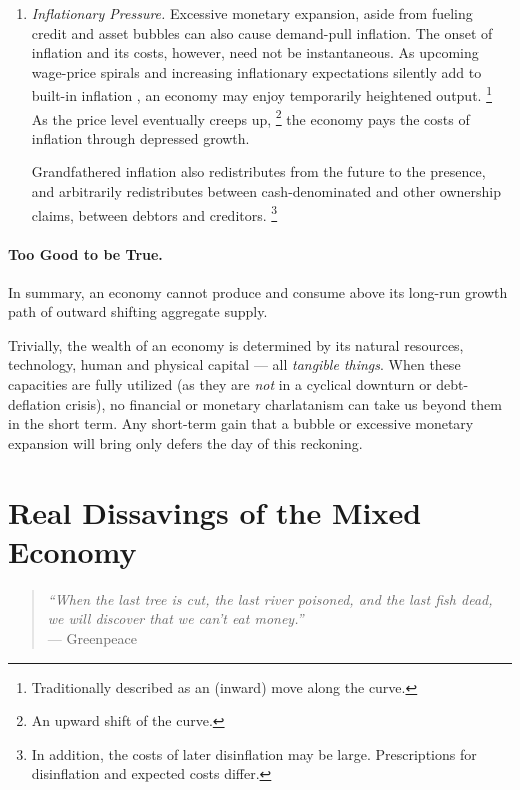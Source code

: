 \begin{enumerate}
	\item {} \label{itm:inflationary-pressure} \emph{Inflationary Pressure.} Excessive monetary expansion, aside from fueling credit and asset bubbles can also cause demand-pull inflation.
The onset of inflation and its costs, however, need not be instantaneous.
As upcoming wage-price spirals and increasing inflationary expectations silently add to built-in inflation \citep{Gordon1988}, an economy may enjoy temporarily  heightened output.
	\footnote{
		Traditionally described as an (inward) move along the \cite{Phillips1958} curve.
	}
	As the price level eventually creeps up,
	\footnote{
		An upward shift of the \cite{Phillips1958} curve.
	}
	the economy pays the costs of inflation through depressed growth.

	Grandfathered inflation also redistributes from the future to the presence, and arbitrarily redistributes between cash-denominated and other ownership claims, between debtors and creditors.
	\footnote{
		In addition, the costs of later disinflation may be large.
		Prescriptions for disinflation and expected costs differ.
	}
\end{enumerate}

\paragraph[Too Good To Be True]{Too Good to be True.}
In summary, an economy cannot produce and consume above its long-run growth path of outward shifting aggregate supply.

Trivially, the wealth of an economy is determined by its natural resources, technology, human and physical capital --- all \emph{tangible things}.
When these capacities are fully utilized (as they are \emph{not} in a cyclical downturn or debt-deflation crisis), no financial or monetary charlatanism can take us beyond them in the short term.
Any short-term gain that a bubble or excessive monetary expansion will bring only defers the day of this reckoning.

\section[Real Dissavings]{Real Dissavings of the Mixed Economy} \label{sec:real-dissavings}

\begin{quote}
	\emph{``When the last tree is cut, the last river poisoned, and the last fish dead, we will discover that we can't eat money.''\\}
	--- Greenpeace
\end{quote}

